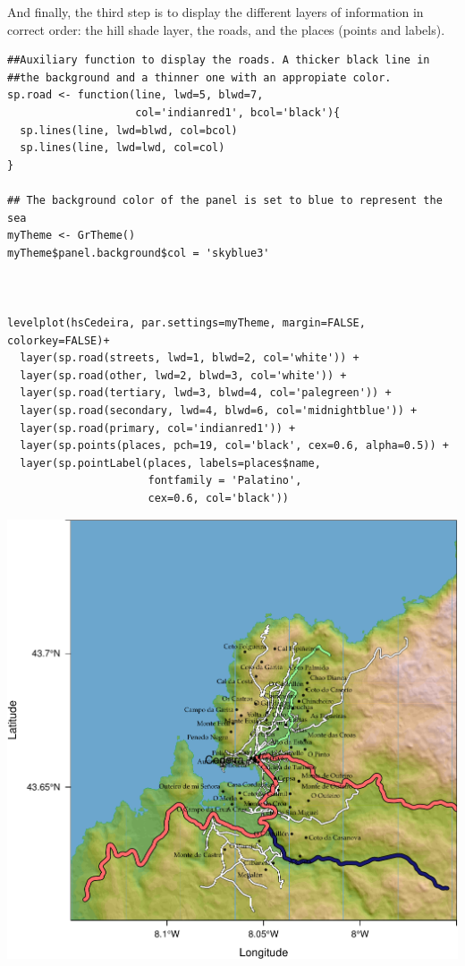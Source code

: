 And finally, the third step is to display the different layers of
information in correct order: the hill shade layer, the roads, and
the places (points and labels).
  

\lstset{language=R}
\begin{lstlisting}
##Auxiliary function to display the roads. A thicker black line in
##the background and a thinner one with an appropiate color.
sp.road <- function(line, lwd=5, blwd=7,
                    col='indianred1', bcol='black'){
  sp.lines(line, lwd=blwd, col=bcol)
  sp.lines(line, lwd=lwd, col=col)
}

## The background color of the panel is set to blue to represent the sea
myTheme <- GrTheme()
myTheme$panel.background$col = 'skyblue3'



levelplot(hsCedeira, par.settings=myTheme, margin=FALSE, colorkey=FALSE)+
  layer(sp.road(streets, lwd=1, blwd=2, col='white')) +
  layer(sp.road(other, lwd=2, blwd=3, col='white')) +
  layer(sp.road(tertiary, lwd=3, blwd=4, col='palegreen')) +
  layer(sp.road(secondary, lwd=4, blwd=6, col='midnightblue')) +
  layer(sp.road(primary, col='indianred1')) +
  layer(sp.points(places, pch=19, col='black', cex=0.6, alpha=0.5)) +
  layer(sp.pointLabel(places, labels=places$name,
                      fontfamily = 'Palatino', 
                      cex=0.6, col='black'))
\end{lstlisting}

\includegraphics[width=.9\linewidth]{figs/cedeiraOsmar.pdf}




